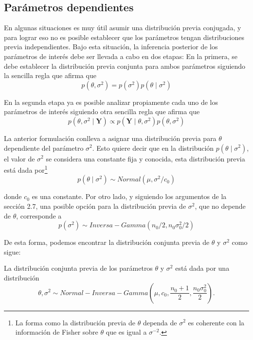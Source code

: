 \documentclass[10pt,openright]{book}\usepackage[]{graphicx}\usepackage[]{color}
\begin{document}
\subsection{Par\'ametros dependientes}

En algunas situaciones es muy \'util asumir una distribuci\'on previa conjugada, y para lograr eso no es posible establecer que los par\'ametros tengan distribuciones previa independientes. Bajo esta situaci\'on, la inferencia posterior de los par\'ametros de inter\'es debe ser llevada a cabo en dos etapas: En la primera, se debe establecer la distribuci\'on previa conjunta para ambos par\'ametros siguiendo la sencilla regla que afirma que
\begin{equation*}
p(\theta,\sigma^2)=p(\sigma^2)p(\theta \mid \sigma^2)
\end{equation*}

En la segunda etapa ya es posible analizar propiamente cada uno de los par\'ametros de inter\'es siguiendo otra sencilla regla que afirma que
\begin{equation*}
p(\theta,\sigma^2 \mid \mathbf{Y})\propto p(\mathbf{Y} \mid \theta,\sigma^2)p(\theta,\sigma^2)
\end{equation*}

La anterior formulaci\'on conlleva a asignar una distribuci\'on previa para $\theta$ dependiente del par\'ametro $\sigma^2$. Esto quiere decir que en la distribuci\'on $p(\theta \mid \sigma^2)$, el valor de $\sigma^2$ se considera una constante fija y conocida, esta distribuci\'on previa est\'a dada por\footnote{La forma como la distribuci\'on previa de $\theta$ dependa de $\sigma^2$ es coherente con la informaci\'on de Fisher sobre $\theta$ que es igual a $\sigma^{-2}$.}
\begin{equation*}
p(\theta \mid \sigma^2)\sim Normal(\mu,\sigma^2/c_0)
\end{equation*}

donde $c_0$ es una constante. Por otro lado, y siguiendo los argumentos de la secci\'on 2.7, una posible opci\'on para la distribuci\'on previa de $\sigma^2$, que no depende de $\theta$, corresponde a
\begin{equation*}
p(\sigma^2)\sim Inversa-Gamma(n_0/2,n_0\sigma^2_0/2)
\end{equation*}

De esta forma, podemos encontrar la distribuci\'on conjunta previa de $\theta$ y $\sigma^2$ como sigue:
\begin{Res}
La distribuci\'on conjunta previa de los par\'ametros $\theta$ y $\sigma^2$ est\'a dada por una distribuci\'on
\begin{equation*}
\theta,\sigma^2 \sim Normal-Inversa-Gamma\left(\mu, c_0, \frac{n_0+1}{2},\frac{n_0\sigma^2_0}{2}\right).
\end{equation*}
\end{Res}
\end{document}
